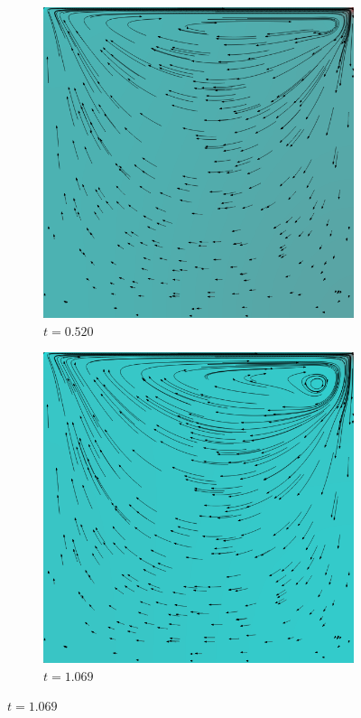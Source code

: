 		\begin{figure}[!htb]
			\centering
			\begin{subfigure}[b]{.5\textwidth}
				\includegraphics[scale = 0.28]{screenshots/re-1000-512-00520.png}
				\caption{$t=0.520$}
			\end{subfigure}%
			\begin{subfigure}[b]{.5\textwidth}
				\includegraphics[scale = 0.28]{screenshots/re-1000-512-01069.png}
				\caption{$t=1.069$}
			\end{subfigure}


\end{figure}
